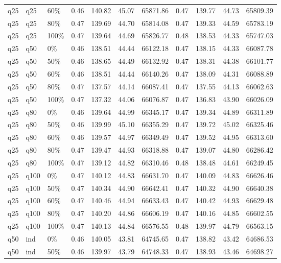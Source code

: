 \begin{longtable}{lllrrrrrrrr}
  q25 & q25 & 60\% & 0.46 & 140.82 & 45.07 & 65871.86 & 0.47 & 139.77 & 44.73 & 65809.39 \\ 
  q25 & q25 & 80\% & 0.47 & 139.69 & 44.70 & 65814.08 & 0.47 & 139.33 & 44.59 & 65783.19 \\ 
  q25 & q25 & 100\% & 0.47 & 139.64 & 44.69 & 65826.77 & 0.48 & 138.53 & 44.33 & 65747.03 \\ 
  q25 & q50 & 0\% & 0.46 & 138.51 & 44.44 & 66122.18 & 0.47 & 138.15 & 44.33 & 66087.78 \\ 
  q25 & q50 & 50\% & 0.46 & 138.65 & 44.49 & 66132.92 & 0.47 & 138.31 & 44.38 & 66101.77 \\ 
  q25 & q50 & 60\% & 0.46 & 138.51 & 44.44 & 66140.26 & 0.47 & 138.09 & 44.31 & 66088.89 \\ 
  q25 & q50 & 80\% & 0.47 & 137.57 & 44.14 & 66087.41 & 0.47 & 137.55 & 44.13 & 66062.63 \\ 
  q25 & q50 & 100\% & 0.47 & 137.32 & 44.06 & 66076.87 & 0.47 & 136.83 & 43.90 & 66026.09 \\ 
  q25 & q80 & 0\% & 0.46 & 139.64 & 44.99 & 66345.17 & 0.47 & 139.34 & 44.89 & 66311.89 \\ 
  q25 & q80 & 50\% & 0.46 & 139.99 & 45.10 & 66355.29 & 0.47 & 139.72 & 45.02 & 66325.46 \\ 
  q25 & q80 & 60\% & 0.46 & 139.57 & 44.97 & 66349.49 & 0.47 & 139.52 & 44.95 & 66313.60 \\ 
  q25 & q80 & 80\% & 0.47 & 139.47 & 44.93 & 66318.88 & 0.47 & 139.07 & 44.80 & 66286.42 \\ 
  q25 & q80 & 100\% & 0.47 & 139.12 & 44.82 & 66310.46 & 0.48 & 138.48 & 44.61 & 66249.45 \\ 
  q25 & q100 & 0\% & 0.47 & 140.12 & 44.83 & 66631.70 & 0.47 & 140.09 & 44.83 & 66626.46 \\ 
  q25 & q100 & 50\% & 0.47 & 140.34 & 44.90 & 66642.41 & 0.47 & 140.32 & 44.90 & 66640.38 \\ 
  q25 & q100 & 60\% & 0.47 & 140.46 & 44.94 & 66633.43 & 0.47 & 140.42 & 44.93 & 66629.48 \\ 
  q25 & q100 & 80\% & 0.47 & 140.20 & 44.86 & 66606.19 & 0.47 & 140.16 & 44.85 & 66602.55 \\ 
  q25 & q100 & 100\% & 0.47 & 140.13 & 44.84 & 66576.55 & 0.48 & 139.97 & 44.79 & 66563.15 \\ 
  q50 & ind & 0\% & 0.46 & 140.05 & 43.81 & 64745.65 & 0.47 & 138.82 & 43.42 & 64686.53 \\ 
  q50 & ind & 50\% & 0.46 & 139.97 & 43.79 & 64748.33 & 0.47 & 138.93 & 43.46 & 64698.27 \\ 

\end{longtable}
